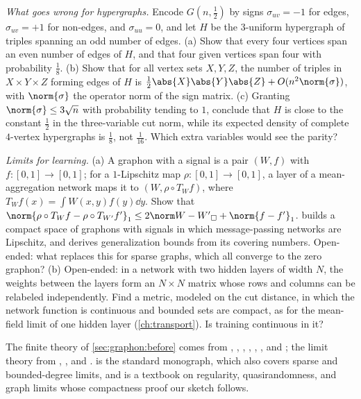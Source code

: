 \begin{refsection}
\begin{exercises}
\item \transfer\hard\label{ex:graphon:hypergraphs} \emph{What goes wrong for hypergraphs.} Encode $G(n,\tfrac12)$ by signs $\sigma_{uv}=-1$ for edges, $\sigma_{uv}=+1$ for non-edges, and $\sigma_{uu}=0$, and let $H$ be the $3$-uniform hypergraph of triples spanning an odd number of edges. (a) Show that every four vertices span an even number of edges of $H$, and that four given vertices span four with probability $\tfrac18$. (b) Show that for all vertex sets $X,Y,Z$, the number of triples in $X\times Y\times Z$ forming edges of $H$ is $\tfrac12\abs{X}\abs{Y}\abs{Z}+O(n^2\norm{\sigma})$, with $\norm{\sigma}$ the operator norm of the sign matrix. (c) Granting $\norm{\sigma}\le3\sqrt n$ with probability tending to $1$, conclude that $H$ is close to the constant $\tfrac12$ in the three-variable cut norm, while its expected density of complete $4$-vertex hypergraphs is $\tfrac18$, not $\tfrac1{16}$. Which extra variables would see the parity? 

\item \research\label{ex:graphon:gnn} \emph{Limits for learning.} (a) A graphon with a signal is a pair $(W,f)$ with $f\colon[0,1]\to[0,1]$; for a $1$-Lipschitz map $\rho\colon[0,1]\to[0,1]$, a layer of a mean-aggregation network maps it to $(W,\rho\circ T_Wf)$, where $T_Wf(x)=\int W(x,y)f(y)\dd y$. Show that $\norm{\rho\circ T_Wf-\rho\circ T_{W'}f'}_1\le2\graphoncut{W-W'}+\norm{f-f'}_1$. \textcite{Levie2023} builds a compact space of graphons with signals in which message-passing networks are Lipschitz, and derives generalization bounds from its covering numbers. Open-ended: what replaces this for sparse graphs, which all converge to the zero graphon? (b) Open-ended: in a network with two hidden layers of width $N$, the weights between the layers form an $N\times N$ matrix whose rows and columns can be relabeled independently. Find a metric, modeled on the cut distance, in which the network function is continuous and bounded sets are compact, as for the mean-field limit of one hidden layer (\cref{ch:transport}). Is training continuous in it?
\end{exercises}

\notesandrefs

The finite theory of \cref{sec:graphon:before} comes from \textcite{Mantel1907}, \textcite{Goodman1959}, \textcite{Szemeredi1978}, \textcite{RuzsaSzemeredi1978}, \textcite{Thomason1987}, \textcite{ChungGrahamWilson1989}, and \textcite{Gowers1997}; the limit theory from \textcite{FriezeKannan1999}, \textcite{LovaszSzegedy2006,LovaszSzegedy2007}, and \textcite{BorgsEtAl2008}. \textcite{Lovasz2012} is the standard monograph, which also covers sparse and bounded-degree limits, and \textcite{Zhao2023} is a textbook on regularity, quasirandomness, and graph limits whose compactness proof our sketch follows.


\end{refsection}

